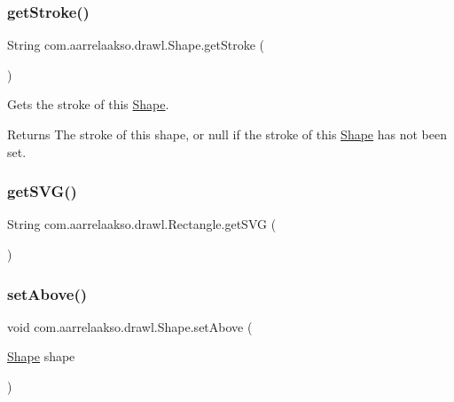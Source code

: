 \subsubsection{\texorpdfstring{get\+Stroke()}{getStroke()}}
{\footnotesize\ttfamily String com.\+aarrelaakso.\+drawl.\+Shape.\+get\+Stroke (\begin{DoxyParamCaption}{ }\end{DoxyParamCaption})\hspace{0.3cm}{\ttfamily [inherited]}}



Gets the stroke of this \hyperlink{classcom_1_1aarrelaakso_1_1drawl_1_1_shape}{Shape}. 

\begin{DoxyReturn}{Returns}
The stroke of this shape, or null if the stroke of this \hyperlink{classcom_1_1aarrelaakso_1_1drawl_1_1_shape}{Shape} has not been set. 
\end{DoxyReturn}
\mbox{\label{classcom_1_1aarrelaakso_1_1drawl_1_1_rectangle_a175f326e054b08426648a81a246904a7}} 
\subsubsection{\texorpdfstring{get\+S\+V\+G()}{getSVG()}}
{\footnotesize\ttfamily String com.\+aarrelaakso.\+drawl.\+Rectangle.\+get\+S\+VG (\begin{DoxyParamCaption}{ }\end{DoxyParamCaption})}

\mbox{\label{classcom_1_1aarrelaakso_1_1drawl_1_1_shape_a942b3cf3365498dc1ac6b0309ce33b86}} 
\subsubsection{\texorpdfstring{set\+Above()}{setAbove()}}
{\footnotesize\ttfamily void com.\+aarrelaakso.\+drawl.\+Shape.\+set\+Above (\begin{DoxyParamCaption}\item[{\hyperlink{classcom_1_1aarrelaakso_1_1drawl_1_1_shape}{Shape}}]{shape }\end{DoxyParamCaption})\hspace{0.3cm}{\ttfamily [inherited]}}



